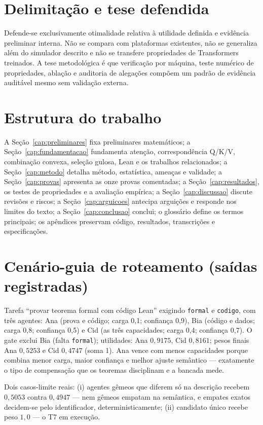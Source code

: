 \section{Delimitação e tese defendida}
Defende-se exclusivamente otimalidade relativa à utilidade definida e evidência preliminar interna. Não se compara com plataformas existentes, não se generaliza além do simulador descrito e não se transfere propriedades de Transformers treinados. A tese metodológica é que verificação por máquina, teste numérico de propriedades, ablação e auditoria de alegações compõem um padrão de evidência auditável mesmo sem validação externa.
\section{Estrutura do trabalho}
A Seção~\ref{cap:preliminares} fixa preliminares matemáticos; a Seção~\ref{cap:fundamentacao} fundamenta atenção, correspondência Q/K/V, combinação convexa, seleção gulosa, Lean e os trabalhos relacionados; a Seção~\ref{cap:metodo} detalha método, estatística, ameaças e validade; a Seção~\ref{cap:provas} apresenta as onze provas comentadas; a Seção~\ref{cap:resultados}, os testes de propriedades e a avaliação empírica; a Seção~\ref{cap:discussao} discute revisões e riscos; a Seção~\ref{cap:arguicoes} antecipa arguições e responde nos limites do texto; a Seção~\ref{cap:conclusao} conclui; o glossário define os termos principais; os apêndices preservam código, resultados, transcrições e especificações.
\section{Cenário-guia de roteamento (saídas registradas)}
Tarefa ``provar teorema formal com código Lean'' exigindo \texttt{formal} e \texttt{codigo}, com três agentes: Ana (prova e código; carga 0,1; confiança 0,9), Bia (código e dados; carga 0,8; confiança 0,5) e Cid (as três capacidades; carga 0,4; confiança 0,7). O gate exclui Bia (falta \texttt{formal}); utilidades: Ana $0{,}9175$, Cid $0{,}8161$; pesos finais Ana $0{,}5253$ e Cid $0{,}4747$ (soma 1). Ana vence com menos capacidades porque combina menor carga, maior confiança e melhor ajuste semântico --- exatamente o tipo de compensação que os teoremas disciplinam e a bancada mede.
\par Dois casos-limite reais: (i) agentes gêmeos que diferem só na descrição recebem $0{,}5053$ contra $0{,}4947$ --- nem gêmeos empatam na semântica, e empates exatos decidem-se pelo identificador, deterministicamente; (ii) candidato único recebe peso $1{,}0$ --- o T7 em execução.
